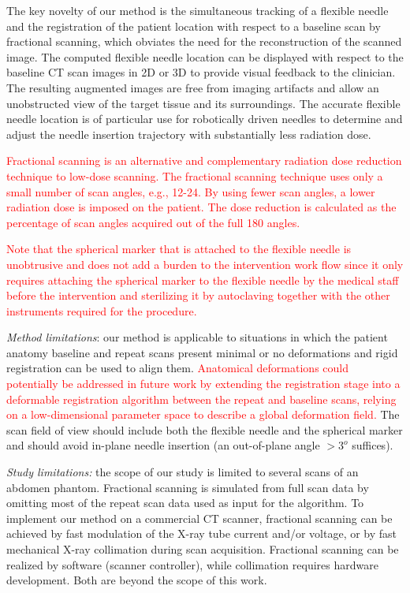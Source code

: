 The key novelty of our method is the simultaneous tracking of a flexible needle and the registration of the patient location with respect to a baseline scan by fractional scanning, which obviates the need for the reconstruction of the scanned image. The computed flexible needle location can be displayed with respect to the baseline CT scan images in 2D or 3D to provide visual feedback to the clinician. The resulting augmented images are free from imaging artifacts and allow an unobstructed view of the target tissue and its surroundings. The accurate flexible needle location is of particular use for robotically driven needles to determine and adjust the needle insertion trajectory with substantially less radiation dose. 

\textcolor{red}{Fractional scanning is an alternative and complementary radiation dose reduction technique to low-dose scanning. The fractional scanning technique uses only a small number of scan angles, e.g., 12-24. By using fewer scan angles, a lower radiation dose is imposed on the patient. The dose reduction is calculated as the percentage of scan angles acquired out of the full 180 angles.}

\textcolor{red}{Note that the spherical marker that is attached to the flexible needle is unobtrusive and does not add a burden to the intervention work flow since it only requires attaching the spherical marker to the flexible needle by the medical staff before the intervention and sterilizing it by autoclaving together with the other instruments required for the procedure.}

{\em Method limitations}: our method is applicable to situations in which the patient anatomy baseline and repeat scans present minimal or no deformations and rigid registration can be used to align them. 
\textcolor{red}{Anatomical deformations could potentially be addressed in future work by extending the registration stage into a deformable registration algorithm between the repeat and baseline scans, relying on a low-dimensional parameter space to describe a global deformation field.}
The scan field of view should include both the flexible needle and the spherical marker and should avoid in-plane needle insertion (an out-of-plane angle $>3^o$ suffices).

{\em Study limitations:} the scope of our study is limited to several scans of an abdomen phantom. Fractional scanning is simulated from full scan data by omitting most of the repeat scan data used as input for the algorithm. To implement our method on a commercial CT scanner, fractional scanning can be achieved by fast modulation of the X-ray tube current and/or voltage, or by fast mechanical X-ray  collimation during scan acquisition. Fractional scanning can be realized by software (scanner controller), while collimation requires hardware development. Both are beyond the scope of this work.
 
